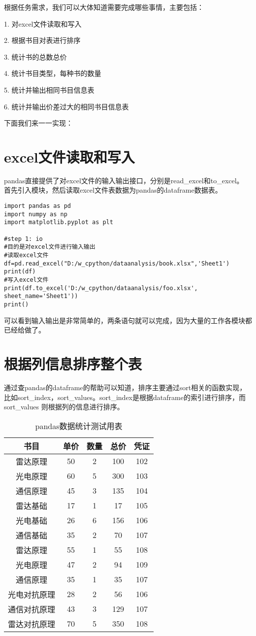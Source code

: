 \documentclass[twoside,11pt]{book}
\begin{document}
根据任务需求，我们可以大体知道需要完成哪些事情，主要包括：

1. 对excel文件读取和写入

2. 根据书目对表进行排序

3. 统计书的总数总价

4. 统计书目类型，每种书的数量

5. 统计并输出相同书目信息表

6. 统计并输出价差过大的相同书目信息表

下面我们来一一实现：

\section{excel文件读取和写入}

pandas直接提供了对excel文件的输入输出接口，分别是read\_excel和to\_excel。
首先引入模块，然后读取excel文件表数据为pandas的dataframe数据表。
\begin{lstlisting}
import pandas as pd
import numpy as np
import matplotlib.pyplot as plt

#step 1: io
#目的是对excel文件进行输入输出
#读取excel文件
df=pd.read_excel("D:/w_cpython/dataanalysis/book.xlsx",'Sheet1')
print(df)
#写入excel文件
print(df.to_excel('D:/w_cpython/dataanalysis/foo.xlsx', sheet_name='Sheet1'))
print()
\end{lstlisting}

可以看到输入输出是非常简单的，两条语句就可以完成，因为大量的工作各模块都已经给做了。

\section{根据列信息排序整个表}

通过查pandas的dataframe的帮助可以知道，排序主要通过sort相关的函数实现，比如sort\_index，sort\_values。sort\_index是根据dataframe的索引进行排序，而sort\_values 则根据列的信息进行排序。

\begin{table}[!htb]
\small\centering
\caption{pandas数据统计测试用表}
\begin{tabular}{ccccc}
  \hline
书目&单价&	数量&	总价&	凭证\\\hline
雷达原理&	50&	2&	100&	102\\
光电原理&	60&	5&	300&	103\\
通信原理&	45&	3&	135&	104\\
雷达基础&	17&	1&	17&	105\\
光电基础&	26&	6&	156&	106\\
通信基础&	35&	2&	70&	107\\
雷达原理&	55&	1&	55&	108\\
光电原理&	47&	2&	94&	109\\
通信原理&	35&	1&	35&	107\\
光电对抗原理&	28&	2&	56	&106\\
通信对抗原理&	43&	3&	129	&107\\
雷达对抗原理&	70&	5&	350	&108\\
  \hline
\end{tabular}
\end{table}
\end{document}
